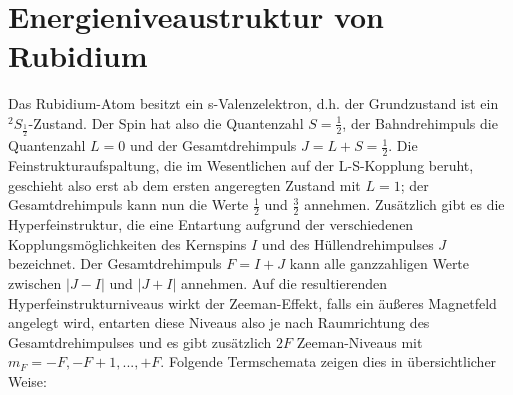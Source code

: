 \documentclass[bigchapter,colorback,accentcolor=tud4b,linedtoc,11pt]{tudreport}
\begin{document}
\section{Energieniveaustruktur von Rubidium}

Das Rubidium-Atom besitzt ein s-Valenzelektron, d.h. der Grundzustand ist ein $^2S_{\frac{1}{2}}$-Zustand. Der Spin hat also die Quantenzahl $S = \frac{1}{2}$, der Bahndrehimpuls die Quantenzahl $L = 0$ und der Gesamtdrehimpuls $J = L + S = \frac{1}{2}$. Die Feinstrukturaufspaltung, die im Wesentlichen auf der L-S-Kopplung beruht, geschieht also erst ab dem ersten angeregten Zustand mit $L = 1$; der Gesamtdrehimpuls kann nun die Werte $\frac{1}{2}$ und $\frac{3}{2}$ annehmen. Zusätzlich gibt es die Hyperfeinstruktur, die eine Entartung aufgrund der verschiedenen Kopplungsmöglichkeiten des Kernspins $I$ und des Hüllendrehimpulses $J$ bezeichnet. Der Gesamtdrehimpuls $F = I + J$ kann alle ganzzahligen Werte zwischen $|J-I|$ und $|J+I|$ annehmen. Auf die resultierenden Hyperfeinstrukturniveaus wirkt der Zeeman-Effekt, falls ein äußeres Magnetfeld angelegt wird, entarten diese Niveaus also je nach Raumrichtung des Gesamtdrehimpulses und es gibt zusätzlich $2F$ Zeeman-Niveaus mit $m_F = -F, -F+1, ..., +F$. Folgende Termschemata zeigen dies in übersichtlicher Weise:
\end{document}
